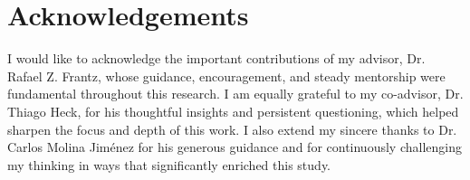 \documentclass[final]{rc-book-2.14}
\begin{document}
\chapter{Acknowledgements}
\label{chp:acknowledge}

\drop
I would like to acknowledge the important contributions of my advisor, Dr. Rafael Z. Frantz, whose guidance, encouragement, and steady mentorship were fundamental throughout this research. I am equally grateful to my co-advisor, Dr. Thiago Heck, for his thoughtful insights and persistent questioning, which helped sharpen the focus and depth of this work. I also extend my sincere thanks to Dr. Carlos Molina Jiménez for his generous guidance and for continuously challenging my thinking in ways that significantly enriched this study.



\end{document}
